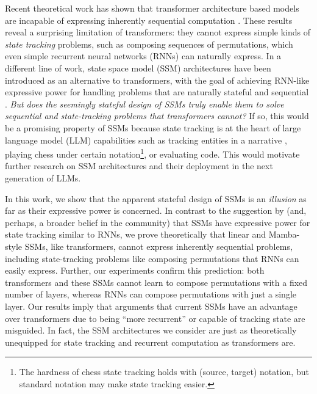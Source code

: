 Recent theoretical work has shown that transformer architecture based models are incapable of expressing inherently sequential computation \citep{merrill-sabharwal-2023-parallelism}. These results reveal a surprising limitation of transformers: they cannot express simple kinds of \emph{state tracking} problems, such as composing sequences of permutations, which even simple recurrent neural networks (RNNs) can naturally express. In a different line of work, state space model (SSM) architectures \citep{gu2021combining,gu2022efficiently,fu2023hungry,gu2023mamba,wang2024mambabyte} have been introduced as an alternative to transformers, with the goal of achieving RNN-like expressive power for handling problems that are naturally stateful and sequential \citep{gu2021combining,gu2022blog}.
\emph{But does the seemingly stateful design of SSMs truly enable them to solve sequential and state-tracking problems that transformers cannot?} If so, this would be a promising property of SSMs because state tracking is at the heart of large language model (LLM) capabilities such as tracking entities in a narrative \citep{heim1983file,kim-schuster-2023-entity}, playing chess under certain notation\footnote{The hardness of chess state tracking holds with (source, target) notation, but standard notation may make state tracking easier.}, or evaluating code. This would motivate further research on SSM architectures and their deployment in the next generation of LLMs.

In this work, we show that the apparent stateful design of SSMs is an \emph{illusion} as far as their expressive power is concerned. In contrast to the suggestion by \citet{gu2021combining,gu2022blog} (and, perhaps, a broader belief in the community) that SSMs have expressive power for state tracking similar to RNNs, we prove theoretically that linear and Mamba-style SSMs, like transformers, cannot express inherently sequential problems, including state-tracking problems like composing permutations that RNNs can easily express. Further, our experiments confirm this prediction: both transformers and these SSMs cannot learn to compose permutations with a fixed number of layers, whereas RNNs can compose permutations with just a single layer. Our results imply that arguments that current SSMs have an advantage over transformers due to being ``more recurrent'' or capable of tracking state are misguided. In fact, the SSM architectures we consider are just as theoretically unequipped for state tracking and recurrent computation as transformers are.

